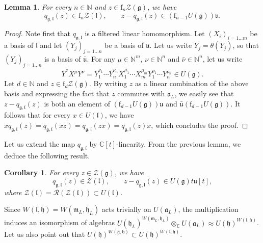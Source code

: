 \documentclass{amsart}
\newtheorem{lemma}[theorem]{Lemma}
\newtheorem{corollary}[theorem]{Corollary}
\theoremstyle{definition}
\begin{document}
\begin{lemma}
    For every $n \in \mathbb{N}$ and $z \in \mathrm{f}_n\mathcal{Z}(\mathfrak{g})$, we have \[q_{\mathfrak{g},\mathfrak{l}}(z) \in \mathrm{f}_n\mathcal{Z}(\mathfrak{l}), \qquad z -q_{\mathfrak{g},\mathfrak{l}}(z) \in (\mathrm{f}_{n-1}U(\mathfrak{g}))\mathfrak{u}.\]
\end{lemma}

\begin{proof}
    Note first that $q_{\mathfrak{g},\mathfrak{l}}$ is a filtered linear homomorphism. Let $(X_i)_{i= 1...m}$ be a basis of $\mathfrak{l}$ and let $(Y_j)_{j= 1 ...n}$ be a basis of $\mathfrak{u}$. Let us write $\bar{Y}_j = \theta(Y_j)$, so that $(Y_j)_{j= 1 ...n}$ is a basis of $\bar{\mathfrak{u}}$. For any $\mu \in \mathbb{N}^m$, $\nu \in\mathbb{N}^n$ and $\bar{\nu} \in\mathbb{N}^n$, let us write
    \[\bar{Y}^{\bar{\nu}} X^\mu Y^\nu = \bar{Y}_1^{\bar{\nu}_1} \cdots\bar{Y}_n^{\bar{\nu}_n}X^{\mu_1}_1 \cdots X_m^{\mu_m} Y_1^{\nu_1}\cdots Y_n^{\nu_n} \in U(\mathfrak{g}). \]
    Let $d \in \mathbb{N}$ and $z \in \mathrm{f}_d\mathcal{Z}(\mathfrak{g})$. By writing $z$ as a linear combination of the above basis and expressing the fact that $z$ commutes with $\mathfrak{a}_L$, we easily see that $z -q_{\mathfrak{g},\mathfrak{l}}(z)$ is both an element of $(\mathrm{f}_{d-1}U(\mathfrak{g}))\mathfrak{u}$ and $\bar{\mathfrak{u}}(\mathrm{f}_{d-1}U(\mathfrak{g}))$. It follows that for every $x \in U(\mathfrak{l})$, we have $xq_{\mathfrak{g},\mathfrak{l}}(z) = q_{\mathfrak{g},\mathfrak{l}}(xz) = q_{\mathfrak{g},\mathfrak{l}}(zx) = q_{\mathfrak{g},\mathfrak{l}}(z)x$, which concludes the proof.
\end{proof}

Let us extend the map $q_{\mathfrak{g},\mathfrak{l}}$ by $\mathbb{C}[t]$-linearity. From the previous lemma, we deduce the following result.

\begin{corollary}\label{lemma_Z_n}
    For every $z \in \mathcal{Z}(\bm{\mathfrak{g}})$, we have \[q_{\mathfrak{g},\mathfrak{l}}(z) \in\mathcal{Z}(\bm{\mathfrak{l}}), \qquad z -q_{\mathfrak{g},\mathfrak{l}}(z) \in U(\bm{\mathfrak{g}})t\mathfrak{u}[t],\]
    where $\mathcal{Z}(\bm{\mathfrak{l}}) = \mathcal{R}(\mathcal{Z}(\mathfrak{l})) \subset U(\bm{\mathfrak{l}})$. 
\end{corollary}

Since $W(\mathfrak{l},\mathfrak{h}) = W(\mathfrak{m}_L,\mathfrak{h}_L)$ acts trivially on $U(\mathfrak{a}_L)$, the multiplication induces an isomorphism of algebras $U(\mathfrak{h}_L)^{W(\mathfrak{m}_L,\mathfrak{h}_L)} \otimes_\mathbb{C} U(\mathfrak{a}_L) \approx U(\mathfrak{h})^{W(\mathfrak{l},\mathfrak{h})}$. Let us also point out that $U(\mathfrak{h})^{W(\mathfrak{g},\mathfrak{h})} \subset U(\mathfrak{h})^{W(\mathfrak{l},\mathfrak{h})}$.
\end{document}
